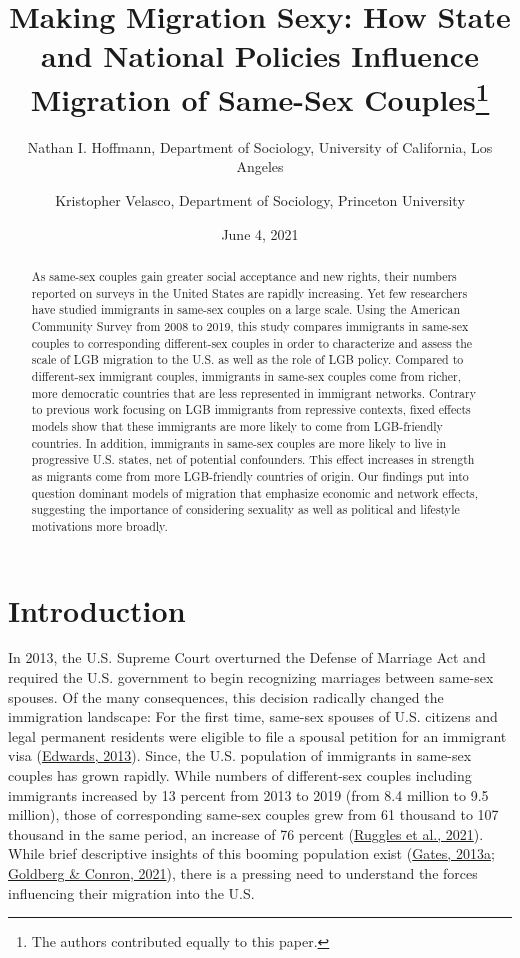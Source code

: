\documentclass[
  11pt,
]{article}
\title{Making Migration Sexy: How State and National Policies Influence Migration of Same-Sex Couples\thanks{The authors contributed equally to this paper.}}
\author{Nathan I. Hoffmann, Department of Sociology, University of California, Los Angeles \and Kristopher Velasco, Department of Sociology, Princeton University}
\date{June 4, 2021}
\begin{document}
\maketitle
\begin{abstract}
As same-sex couples gain greater social acceptance and new rights, their numbers reported on surveys in the United States are rapidly increasing. Yet few researchers have studied immigrants in same-sex couples on a large scale. Using the American Community Survey from 2008 to 2019, this study compares immigrants in same-sex couples to corresponding different-sex couples in order to characterize and assess the scale of LGB migration to the U.S. as well as the role of LGB policy. Compared to different-sex immigrant couples, immigrants in same-sex couples come from richer, more democratic countries that are less represented in immigrant networks. Contrary to previous work focusing on LGB immigrants from repressive contexts, fixed effects models show that these immigrants are more likely to come from LGB-friendly countries. In addition, immigrants in same-sex couples are more likely to live in progressive U.S. states, net of potential confounders. This effect increases in strength as migrants come from more LGB-friendly countries of origin. Our findings put into question dominant models of migration that emphasize economic and network effects, suggesting the importance of considering sexuality as well as political and lifestyle motivations more broadly.
\end{abstract}

\hypertarget{introduction}{%
\section{Introduction}\label{introduction}}

In 2013, the U.S. Supreme Court overturned the Defense of Marriage Act and required the U.S. government to begin recognizing marriages between same-sex spouses. Of the many consequences, this decision radically changed the immigration landscape: For the first time, same-sex spouses of U.S. citizens and legal permanent residents were eligible to file a spousal petition for an immigrant visa (\protect\hyperlink{ref-edwards_2013}{Edwards, 2013}). Since, the U.S. population of immigrants in same-sex couples has grown rapidly. While numbers of different-sex couples including immigrants increased by 13 percent from 2013 to 2019 (from 8.4 million to 9.5 million), those of corresponding same-sex couples grew from 61 thousand to 107 thousand in the same period, an increase of 76 percent (\protect\hyperlink{ref-ruggles_2021}{Ruggles et al., 2021}). While brief descriptive insights of this booming population exist (\protect\hyperlink{ref-gates_2013}{Gates, 2013a}; \protect\hyperlink{ref-goldberg_2021}{Goldberg \& Conron, 2021}), there is a pressing need to understand the forces influencing their migration into the U.S.
\end{document}
